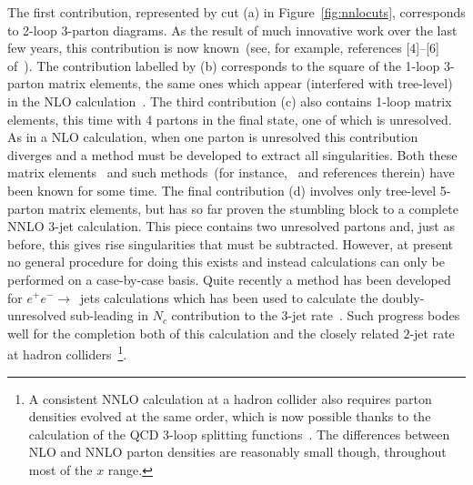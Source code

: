 \documentclass[12pt]{iopart}
\begin{document}
The first contribution, represented by cut (a) in Figure~\ref{fig:nnlocuts},
corresponds to 2-loop 3-parton diagrams. As the result of much innovative work
over the last few years, this contribution is now known~(see, for example,
references [4]--[6] of~\cite{Gehrmann-DeRidder:2005cm}). The contribution
labelled by (b) corresponds to the square of the 1-loop 3-parton matrix elements,
the same ones which appear (interfered with tree-level) in the NLO
calculation~\cite{Ellis:1980wv,Fabricius:1981sx}. The third contribution (c)
also contains 1-loop matrix elements, this time with 4 partons in the final
state, one of which is unresolved. As in a NLO calculation, when one parton is
unresolved this contribution diverges and a method must be developed to extract
all singularities. Both these matrix
elements~\cite{Glover:1996eh,Bern:1996ka,Campbell:1997tv,Bern:1997sc} and such
methods~(for instance,~\cite{Badger:2004uk} and references therein) have been
known for some time. The final contribution (d) involves only tree-level
5-parton matrix elements, but has so far proven the stumbling block to a complete
NNLO $3$-jet calculation. This piece contains two unresolved partons and, just
as before, this gives rise singularities that must be subtracted. However,
at present no general procedure for doing this exists and instead calculations
can only be performed on a case-by-case basis. Quite recently a method has
been developed for $e^+ e^- \to$~jets calculations which has been used to
calculate the doubly-unresolved sub-leading in $N_c$ contribution to the
$3$-jet rate~\cite{Gehrmann-DeRidder:2005cm}. Such progress bodes well for the
completion both of this calculation and the closely related $2$-jet rate at
hadron colliders~\footnote{
A consistent NNLO calculation at a hadron collider also requires parton densities evolved at the same order, which
is now possible thanks to the calculation of the QCD 3-loop splitting functions~\cite{Moch:2004pa,Vogt:2004mw}. The
differences between NLO and NNLO parton densities are reasonably small though, throughout most of the $x$ range.}.  
\end{document}
